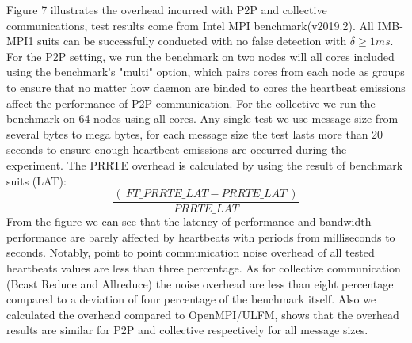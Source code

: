 \documentclass[sigconf]{acmart}
\begin{document}
Figure 7 illustrates the overhead incurred with P2P and collective communications, test results come from Intel MPI benchmark(v2019.2). All IMB-MPI1 suits can be successfully conducted with no false detection with $ \delta \geq 1 ms $. For the P2P setting, we run the benchmark on two nodes will all cores included using the benchmark's "multi" option, which pairs cores from each node as groups to ensure that no matter how daemon are binded to cores the heartbeat emissions affect the performance of P2P communication. For the collective we run the benchmark on 64 nodes using all cores. Any single test we use message size from several bytes to mega bytes, for each message size the test lasts more than 20 seconds to ensure enough heartbeat emissions are occurred during the experiment. The PRRTE overhead is calculated by using the result of benchmark suits (LAT): 
\begin{equation}
\frac{(\ {FT\_PRRTE\_LAT - PRRTE\_LAT}\ )}{PRRTE\_LAT} 
\end{equation}
 From the figure we can see that the latency of performance and bandwidth performance are barely affected by heartbeats with periods from milliseconds to seconds. Notably, point to point communication noise overhead of all tested heartbeats values are less than three percentage. As for collective communication (Bcast Reduce and Allreduce) the noise overhead are less than eight percentage compared to a deviation of four percentage of the benchmark itself. Also we calculated the overhead compared to OpenMPI/ULFM, shows that the overhead results are similar for P2P and collective respectively for all message sizes.
\end{document}
